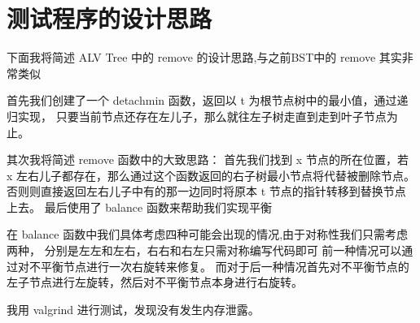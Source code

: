 \documentclass[UTF8]{ctexart}
\begin{document}
\pagestyle{fancy}
\fancyhead{}

\section{测试程序的设计思路}

下面我将简述 ALV Tree 中的 remove 的设计思路,与之前BST中的 remove 其实非常类似 

首先我们创建了一个 detachmin 函数，返回以 t 为根节点树中的最小值，通过递归实现，
只要当前节点还存在左儿子，那么就往左子树走直到走到叶子节点为止。

其次我将简述 remove 函数中的大致思路：
首先我们找到 x 节点的所在位置，若 x 左右儿子都存在，那么通过这个函数返回的右子树最小节点将代替被删除节点。
否则则直接返回左右儿子中有的那一边同时将原本 t 节点的指针转移到替换节点上去。
最后使用了 balance 函数来帮助我们实现平衡

在 balance 函数中我们具体考虑四种可能会出现的情况,由于对称性我们只需考虑两种，
分别是左左和左右，右右和右左只需对称编写代码即可
前一种情况可以通过对不平衡节点进行一次右旋转来修复。
而对于后一种情况首先对不平衡节点的左子节点进行左旋转，然后对不平衡节点本身进行右旋转。

我用 valgrind 进行测试，发现没有发生内存泄露。
\end{document}
